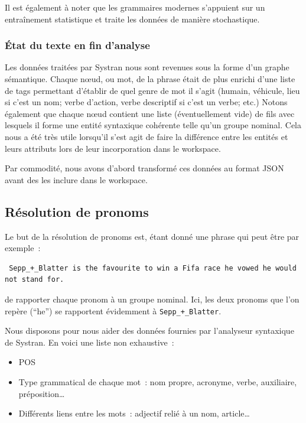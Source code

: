 \documentclass[a4paper, 12pt]{article}
\begin{document}
Il est également à noter que les grammaires modernes s'appuient sur un entraînement statistique et traite les données de manière stochastique.

\subsubsection{\'Etat du texte en fin d'analyse}
Les données traitées par Systran nous sont revenues sous la forme d'un graphe sémantique. Chaque nœud, ou mot, de la phrase était de plus enrichi d'une liste de tags permettant d'établir de quel genre de mot il s'agit (humain, véhicule, lieu si c'est un nom; verbe d'action, verbe descriptif si c'est un verbe; etc.) Notons également que chaque nœud contient une liste (éventuellement vide) de fils avec lesquels il forme une entité syntaxique cohérente telle qu'un groupe nominal. Cela nous a été très utile lorsqu'il s'est agit de faire la différence entre les entités et leurs attributs lors de leur incorporation dans le workspace.

Par commodité, nous avons d'abord transformé ces données au format JSON avant des les inclure dans le workspace.

\subsection{Résolution de pronoms}

Le but de la résolution de pronoms est, étant donné une phrase qui peut être par exemple~:

\begin{verbatim}
 Sepp_+_Blatter is the favourite to win a Fifa race he vowed he would not stand for.
\end{verbatim}
de rapporter chaque pronom à un groupe nominal. Ici, les deux pronoms que l'on repère (``he'') se rapportent évidemment à \verb|Sepp_+_Blatter|.

Nous disposons pour nous aider des données fournies par l'analyseur syntaxique de Systran. En voici une liste non exhaustive~:
\begin{itemize}
 \item POS
 \item Type grammatical de chaque mot~: nom propre, acronyme, verbe, auxiliaire, préposition\ldots{}
 \item Différents liens entre les mots~: adjectif relié à un nom, article\ldots{}
\end{itemize}
\end{document}
